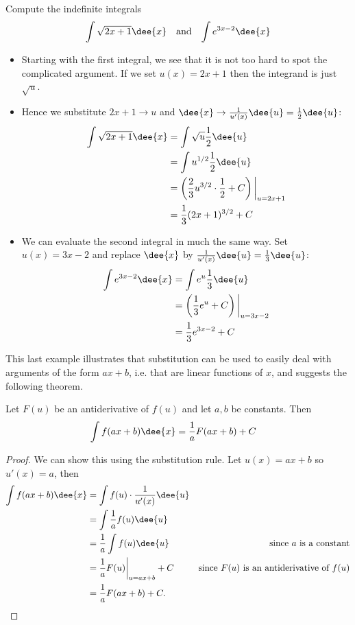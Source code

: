 \begin{eg}
Compute the indefinite integrals
\begin{align*}
  \int \sqrt{2x+1}\dee{x} && \text{and} && \int e^{3x-2}\dee{x}
\end{align*}
\soln
\begin{itemize}
 \item Starting with the first integral, we see that it is not too hard to spot
the complicated argument. If we set $u(x)=2x+1$ then the integrand is just $\sqrt{u}$.
\item Hence we substitute $2x+1 \rightarrow u$ and $\dee{x} \rightarrow
\frac{1}{u'(x)}\dee{u}=\frac{1}{2}\dee{u}$:
\begin{align*}
  \int \sqrt{2x+1}\dee{x}
&= \int \sqrt{u} \frac{1}{2} \dee{u} \\
&= \int u^{1/2} \frac{1}{2} \dee{u} \\
&= \left( \frac{2}{3}u^{3/2}\cdot\frac{1}{2}  +C\right)\bigg|_{u=2x+1}\\
&= \frac{1}{3} (2x+1)^{3/2} + C
\end{align*}
\item We can evaluate the second integral in much the same way. Set $u(x)=3x-2$ and
replace $\dee{x}$ by $\frac{1}{u'(x)}\dee{u} = \frac{1}{3}\dee{u}$:
\begin{align*}
  \int e^{3x-2}\dee{x}
&= \int e^u \frac{1}{3}\dee{u} \\
&= \left( \frac{1}{3} e^u + C\right)\bigg|_{u=3x-2}\\
&= \frac{1}{3} e^{3x-2} +C
\end{align*}
\end{itemize}
\end{eg}
This last example illustrates that substitution can be used to easily deal with arguments
of the form $ax+b$, i.e. that are linear functions of $x$, and suggests the following
theorem.
\begin{theorem}\label{thm subs linear}
Let $F(u)$ be an antiderivative of $f(u)$ and let $a,b$ be constants. Then
\begin{align*}
  \int f(ax+b)\dee{x} &= \frac{1}{a} F(ax+b) +C
\end{align*}
\end{theorem}
\begin{proof}
 We can show this using the substitution rule. Let $u(x)=ax+b$ so $u'(x)=a$, then
\begin{align*}
  \int f(ax+b) \dee{x}
&= \int f(u) \cdot \frac{1}{u'(x)}\dee{u}\\
&= \int \frac{1}{a} f(u) \dee{u} \\
&= \frac{1}{a} \int f(u) \dee{u} & \text{since $a$ is a constant}\\
&= \frac{1}{a} F(u)\bigg|_{u=ax+b} +C & \text{since $F(u)$ is an antiderivative of
$f(u)$}\\
&= \frac{1}{a} F(ax+b) +C.
\end{align*}
\end{proof}

